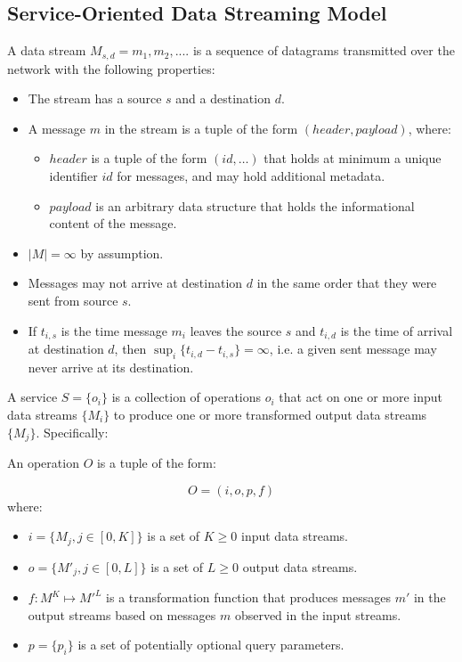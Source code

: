 \subsection{Service-Oriented Data Streaming Model}
\label{sec:rheos_data_streaming_model}

A data stream $M_{s,d} = {m_1, m_2, ....}$ is a sequence of datagrams transmitted over the network with the following properties:

\begin{itemize}
    \item The stream has a source $s$ and a destination $d$.
    \item A message $m$ in the stream is a tuple of the form $(header, payload)$, where:
    \begin{itemize}
        \item $header$ is a tuple of the form $(id, \dots)$ that holds at minimum a unique identifier $id$ for messages, and may hold additional metadata.
        \item $payload$ is an arbitrary data structure that holds the informational content of the message. 
    \end{itemize}
    \item $|M| = \infty$ by assumption.
    \item Messages may not arrive at destination $d$ in the same order that they were sent from source $s$.
    \item If $t_{i,s}$ is the time message $m_i$ leaves the source $s$ and $t_{i,d}$ is the time of arrival at destination $d$, then $\sup_i \{t_{i,d} - t_{i,s}\} = \infty$, i.e. a given sent message may never arrive at its destination.
\end{itemize}

A service $S = \{o_i\}$ is a collection of operations $o_i$ that act on one or more input data streams $\{M_i\}$ to produce one or more transformed output data streams $\{M_j\}$. Specifically:

An operation $O$ is a tuple of the form:

\begin{equation}
\label{eq:service_opertaion_equation}
O = (i,o,p,f)
\end{equation} 
where:
\begin{itemize} 
    \item $i = \{M_j, j \in [0, K]\}$ is a set of $K \ge 0$ input data streams.
    \item $o = \{M'_j, j \in [0, L]\}$ is a set of $L \ge 0$ output data streams.
    \item $f:M^K \mapsto M'^L$ is a transformation function that produces messages $m'$ in the output streams based on messages $m$ observed in the input streams.
    \item $p = \{p_i\}$ is a set of potentially optional query parameters.  
\end{itemize}

